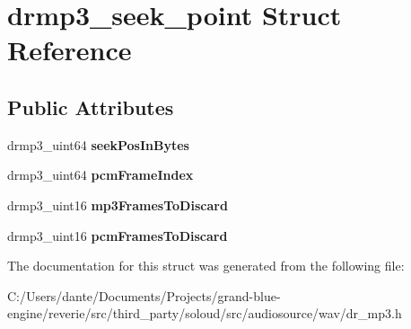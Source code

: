 \hypertarget{structdrmp3__seek__point}{}\section{drmp3\+\_\+seek\+\_\+point Struct Reference}
\label{structdrmp3__seek__point}
\subsection*{Public Attributes}
\begin{DoxyCompactItemize}
\item 
\mbox{\label{structdrmp3__seek__point_a5398f0b18f7fe2641fb711811c113ee4}} 
drmp3\+\_\+uint64 {\bfseries seek\+Pos\+In\+Bytes}
\item 
\mbox{\label{structdrmp3__seek__point_a66ef89cbe38ffcc98e90ca129eaa610c}} 
drmp3\+\_\+uint64 {\bfseries pcm\+Frame\+Index}
\item 
\mbox{\label{structdrmp3__seek__point_aa34353c7d85e13d6a7e2eb5e96b1c831}} 
drmp3\+\_\+uint16 {\bfseries mp3\+Frames\+To\+Discard}
\item 
\mbox{\label{structdrmp3__seek__point_ac4c6056504bcca1852715936035c1a31}} 
drmp3\+\_\+uint16 {\bfseries pcm\+Frames\+To\+Discard}
\end{DoxyCompactItemize}


The documentation for this struct was generated from the following file\+:\begin{DoxyCompactItemize}
\item 
C\+:/\+Users/dante/\+Documents/\+Projects/grand-\/blue-\/engine/reverie/src/third\+\_\+party/soloud/src/audiosource/wav/dr\+\_\+mp3.\+h\end{DoxyCompactItemize}
